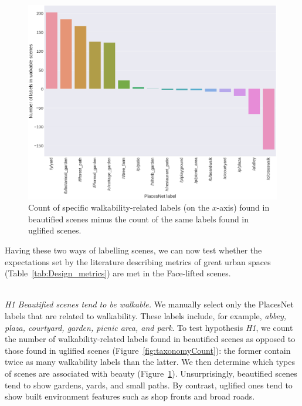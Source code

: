\begin{figure}[h]
    \centering
    \includegraphics[width=\columnwidth]{walkable_taxonomy.png}
    \caption{Count of specific walkability-related labels  (on the $x$-axis) found in beautified scenes minus the count of the same labels found in uglified scenes.}
    \label{fig:WalkableTnomy}
\end{figure}


Having these two ways of labelling scenes, we can now test whether the expectations set by the literature describing metrics of great urban spaces (Table~\ref{tab:Design_metrics}) are  met in the Face-lifted scenes. 


\mbox{ } \\
\noindent
\emph{H1 Beautified scenes tend to be walkable.}
We manually select only the PlacesNet labels that are related to walkability. These labels include, for example, \textit{abbey, plaza, courtyard, garden, picnic area, \textrm{and} park}. To test hypothesis \emph{H1}, we count the number of walkability-related labels found in beautified scenes as opposed to those found in uglified scenes (Figure~\ref{fig:taxonomyCount}): the former contain twice as many walkability labels than the latter. We then determine which types of scenes are associated with beauty (Figure~\ref{fig:WalkableTnomy}). Unsurprisingly, beautified scenes tend to show gardens, yards, and small paths. By contrast, uglified ones tend to show built environment features such as shop fronts and broad roads. 


